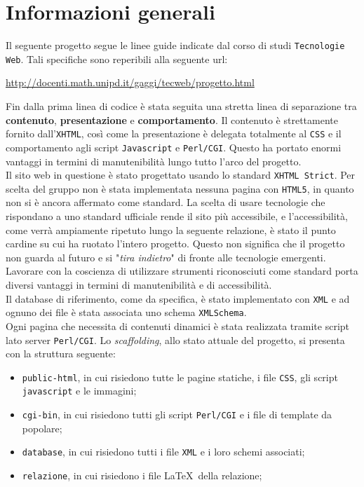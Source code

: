 \section{Informazioni generali}

Il seguente progetto segue le linee guide indicate dal corso di studi \texttt{Tecnologie Web}. Tali specifiche sono reperibili alla seguente url:

\begin{center}
	\url{http://docenti.math.unipd.it/gaggi/tecweb/progetto.html}
\end{center}
Fin dalla prima linea di codice è stata seguita una stretta linea di separazione tra \textbf{contenuto}, \textbf{presentazione} e \textbf{comportamento}. Il contenuto è strettamente fornito dall'\texttt{XHTML}, così come la presentazione è delegata totalmente al \texttt{CSS} e il comportamento agli script \texttt{Javascript} e \texttt{Perl/CGI}. Questo ha portato enormi vantaggi in termini di manutenibilità lungo tutto l'arco del progetto. \\
Il sito web in questione è stato progettato usando lo standard \texttt{XHTML Strict}. Per scelta del gruppo non è stata implementata nessuna pagina con \texttt{HTML5}, in quanto non si è ancora affermato come standard. La scelta di usare tecnologie che rispondano a uno standard ufficiale rende il sito più accessibile, e l'accessibilità, come verrà ampiamente ripetuto lungo la seguente relazione, è stato il punto cardine su cui ha ruotato l'intero progetto. Questo non significa che il progetto non guarda al futuro e si "\textit{tira indietro}" di fronte alle tecnologie emergenti. Lavorare con la coscienza di utilizzare strumenti riconosciuti come standard porta diversi vantaggi in termini di manutenibilità e di accessibilità. \\
Il database di riferimento, come da specifica, è stato implementato con \texttt{XML} e ad ognuno dei file è stata associata uno schema \texttt{XMLSchema}. \\
Ogni pagina che necessita di contenuti dinamici è stata realizzata tramite script lato server \texttt{Perl/CGI}.
Lo \textit{scaffolding}, allo stato attuale del progetto, si presenta con la struttura seguente:

\begin{itemize}

	\item \texttt{public-html}, in cui risiedono tutte le pagine statiche, i file \texttt{CSS}, gli script \texttt{javascript} e le immagini;
	\item \texttt{cgi-bin}, in cui risiedono tutti gli script \texttt{Perl/CGI} e i file di template da popolare;
	\item \texttt{database}, in cui risiedono tutti i file \texttt{XML} e i loro schemi associati;
	\item \texttt{relazione}, in cui risiedono i file \LaTeX\ della relazione;

\end{itemize}

